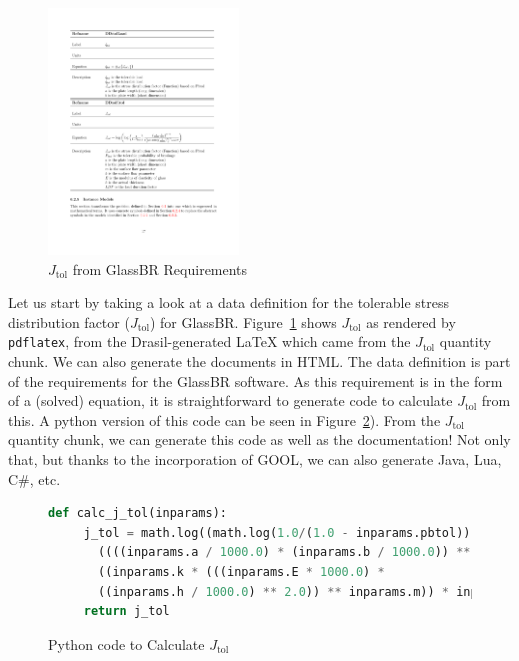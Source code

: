 \documentclass[sigconf]{acmart}
\newcommand{\jtol}{$J_{\mbox{tol}}$}
\begin{document}
\begin{figure}
\begin{center}
\includegraphics[width=0.45\textwidth]{./figures/Jtol_pdf.pdf}
\end{center}
\caption{\jtol{} from GlassBR Requirements}
\label{Fig_Jtolpdf}
\end{figure}

Let us start by taking a look at a data definition for the tolerable stress
distribution factor (\jtol{}) for GlassBR. Figure~\ref{Fig_Jtolpdf} shows
\jtol{} as rendered by \texttt{pdflatex}, from the Drasil-generated LaTeX 
which came from the \jtol{} quantity chunk. We can also generate the documents
in HTML. The data definition is part of the requirements for the GlassBR
software.  As this requirement is in the form of a (solved) equation, it is
straightforward to generate code to
calculate \jtol{} from this.  A python version of this code can be seen in
Figure~\ref{Fig_JtolPython}). From the \jtol{} quantity chunk, we can generate
this code as well as the documentation!  Not only that, but thanks to the
incorporation of GOOL, we can also generate Java, Lua, C\#, etc.

 \begin{figure}
 \begin{lstlisting}[language=python, frame=single, showstringspaces=false]
 def calc_j_tol(inparams):
     j_tol = math.log((math.log(1.0/(1.0 - inparams.pbtol))) * 
       ((((inparams.a / 1000.0) * (inparams.b / 1000.0)) ** (inparams.m - 1.0)) / 
       ((inparams.k * (((inparams.E * 1000.0) * 
       ((inparams.h / 1000.0) ** 2.0)) ** inparams.m)) * inparams.ldf))) 
     return j_tol
 \end{lstlisting}
 \caption{Python code to Calculate \jtol{}}
 \label{Fig_JtolPython}
 \end{figure}
\end{document}
